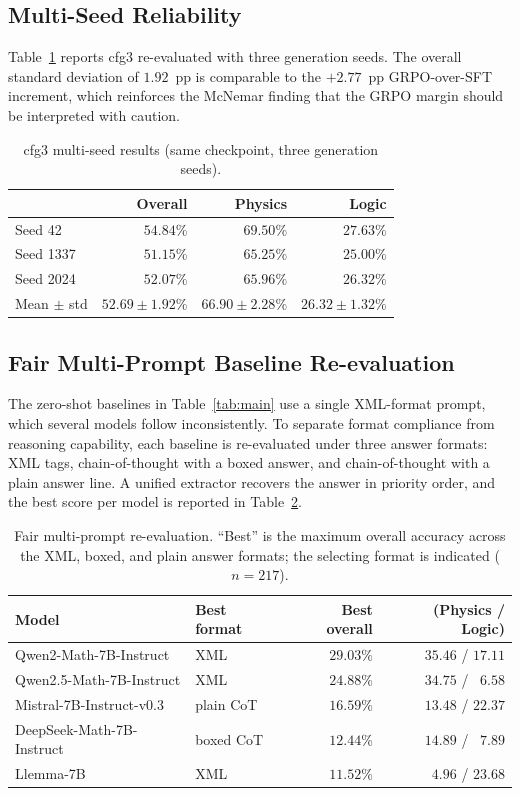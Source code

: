 \documentclass[preprint,12pt]{elsarticle}
\begin{document}
\subsection{Multi-Seed Reliability}
Table~\ref{tab:multiseed} reports cfg3 re-evaluated with three generation
seeds. The overall standard deviation of $1.92$~pp is comparable to the
$+2.77$~pp GRPO-over-SFT increment, which reinforces the McNemar finding
that the GRPO margin should be interpreted with caution.

\begin{table}[t]
\centering
\caption{cfg3 multi-seed results (same checkpoint, three generation seeds).}
\label{tab:multiseed}
\begin{tabular}{lrrr}
\toprule
& Overall & Physics & Logic \\
\midrule
Seed 42   & $54.84\%$ & $69.50\%$ & $27.63\%$ \\
Seed 1337 & $51.15\%$ & $65.25\%$ & $25.00\%$ \\
Seed 2024 & $52.07\%$ & $65.96\%$ & $26.32\%$ \\
\midrule
Mean $\pm$ std & $52.69\pm1.92\%$ & $66.90\pm2.28\%$ & $26.32\pm1.32\%$ \\
\bottomrule
\end{tabular}
\end{table}

\subsection{Fair Multi-Prompt Baseline Re-evaluation}
\label{sec:fair}
The zero-shot baselines in Table~\ref{tab:main} use a single XML-format
prompt, which several models follow inconsistently. To separate format
compliance from reasoning capability, each baseline is re-evaluated under
three answer formats: XML tags, chain-of-thought with a boxed answer, and
chain-of-thought with a plain answer line. A unified extractor recovers the
answer in priority order, and the best score per model is reported in
Table~\ref{tab:fair}.

\begin{table}[t]
\centering
\caption{Fair multi-prompt re-evaluation. ``Best'' is the maximum overall
         accuracy across the XML, boxed, and plain answer formats; the
         selecting format is indicated ($n=217$).}
\label{tab:fair}
\begin{tabular}{llrr}
\toprule
Model & Best format & Best overall & (Physics / Logic) \\
\midrule
Qwen2-Math-7B-Instruct   & XML        & $29.03\%$ & $35.46$ / $17.11$ \\
Qwen2.5-Math-7B-Instruct & XML        & $24.88\%$ & $34.75$ / $\phantom{0}6.58$ \\
Mistral-7B-Instruct-v0.3 & plain CoT  & $16.59\%$ & $13.48$ / $22.37$ \\
DeepSeek-Math-7B-Instruct& boxed CoT  & $12.44\%$ & $14.89$ / $\phantom{0}7.89$ \\
Llemma-7B                & XML        & $11.52\%$ & $\phantom{0}4.96$ / $23.68$ \\
\bottomrule
\end{tabular}
\end{table}
\end{document}
